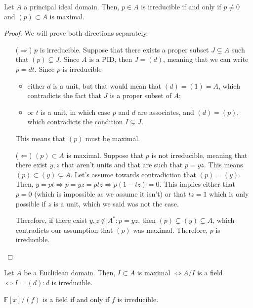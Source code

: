 \begin{theorem}
  Let $A$ a principal ideal domain. Then, $p \in A$ is irreducible if and only if $p \neq 0$ and $(p) \subset A$ is maximal.
\end{theorem}
\begin{proof}
  We will prove both directions separately. 
  \begin{itemize}
    \item[($\Rightarrow$)] $p$ is irreducible. Suppose that there exists a proper subset $J \subsetneq A$ such that $(p) \subsetneq J$. Since $A$ is a PID, then $J = (d)$, meaning that we can write $p = dt$. Since $p$ is irreducible
    \begin{itemize}
      \item either $d$ is a unit, but that would mean that $(d) = (1) = A$, which contradicts the fact that $J$ is a proper subset of $A$; 
      \item or $t$ is a unit, in which case $p$ and $d$ are associates, and $(d) = (p)$, which contradicts the condition $I \subsetneq J$.
    \end{itemize}
    This means that $(p)$ must be maximal. 
    \item[($\Leftarrow$)] $(p) \subset A$ is maximal. Suppose that $p$ is not irreducible, meaning that there exist $y, z$ that aren't units and that are such that $p = yz$. This means $(p) \subset (y) \subsetneq A$. Let's assume towards contradiction that $(p) = (y)$. Then, $y = pt \Rightarrow p = yz = ptz \Rightarrow p(1 - tz) = 0$. This implies either that $p = 0$ (which is impossible as we assume it isn't) or that $tz = 1$ which is only possible if $z$ is a unit, which we said was not the case. 

    Therefore, if there exist $y, z \notin A^*: p = yz$, then $(p) \subsetneq (y) \subsetneq A$, which contradicts our assumption that $(p)$ was maximal. Therefore, $p$ is irreducible.
  \end{itemize}
\end{proof}

\begin{theorem}
  Let $A$ be a Euclidean domain. Then, $I \subset A$ is maximal $\Leftrightarrow A/I$ is a field $\Leftrightarrow I = (d): d$ is irreducible. 
\end{theorem}
\begin{corollary}
  $\mathbb{F}[x]/(f)$ is a field if and only if $f$ is irreducible. 
\end{corollary}


